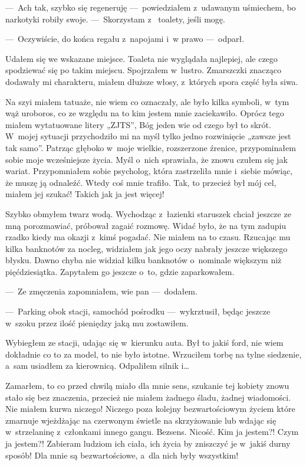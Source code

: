 ---~Ach tak, szybko się regeneruję ---~powiedziałem z~udawanym uśmiechem, bo narkotyki robiły swoje. ---~Skorzystam z~
toalety, jeśli mogę.

---~Oczywiście, do końca regału z~napojami i~w prawo ---~odparł.
 
Udałem się we wskazane miejsce. Toaleta nie wyglądała najlepiej, ale czego spodziewać się po takim miejscu. 
Spojrzałem w~lustro. Zmarszczki znacząco dodawały mi charakteru, miałem dłuższe włosy, z~których spora część była 
siwa. 

Na szyi miałem tatuaże, nie wiem co oznaczały, ale było kilka symboli, w~tym wąż uroboros, co ze względu na to kim 
jestem mnie zaciekawiło. Oprócz tego miałem wytatuowane litery „ZJTS”, Bóg jeden wie od czego był to skrót. W~mojej 
sytuacji przychodziło mi na myśl tylko jedno rozwinięcie „zawsze jest tak samo”. Patrząc głęboko w~moje wielkie, 
rozszerzone źrenice, przypominałem sobie moje wcześniejsze życia. Myśl o~nich sprawiała, że znowu czułem się jak 
wariat. Przypomniałem sobie psycholog, która zastrzeliła mnie i~siebie mówiąc, że muszę ją odnaleźć. Wtedy coś mnie 
trafiło. Tak, to przecież był mój cel, miałem jej szukać! Takich jak ja jest więcej! 

Szybko obmyłem twarz wodą. Wychodząc z~łazienki staruszek chciał jeszcze ze mną porozmawiać, próbował zagaić rozmowę. 
Widać było, że na tym zadupiu rzadko kiedy ma okazji z~kimś pogadać. Nie miałem na to czasu. Rzucając mu kilka 
banknotów za nocleg, widziałem jak jego oczy nabrały jeszcze większego błysku. Dawno chyba nie widział kilku 
banknotów o~nominale większym niż pięćdziesiątka. Zapytałem go jeszcze o~to, gdzie zaparkowałem.

---~Ze zmęczenia zapomniałem, wie pan ---~dodałem.

---~Parking obok stacji, samochód pośrodku ---~wykrztusił, będąc jeszcze w~szoku przez ilość pieniędzy jaką mu 
zostawiłem.
 
Wybiegłem ze stacji, udając się w~kierunku auta. Był to jakiś ford, nie wiem dokładnie co to za model, to nie było 
istotne. Wrzuciłem torbę na tylne siedzenie, a~sam usiadłem za kierownicą. Odpaliłem silnik i… 

Zamarłem, to co przed chwilą miało dla mnie sens, szukanie tej kobiety znowu stało się bez znaczenia, przecież nie 
miałem żadnego śladu, żadnej wiadomości. Nie miałem kurwa niczego! Niczego poza kolejny bezwartościowym życiem które 
zmarnuje wjeżdżając na czerwonym świetle na skrzyżowanie lub wdając się w~strzelaninę z~członkami innego gangu. 
Bezsens. Nicość. Kim ja jestem?! Czym ja jestem?! Zabieram ludziom ich ciała, ich życia by zniszczyć je w~jakiś durny 
sposób! Dla mnie są bezwartościowe, a~dla nich były wszystkim!

